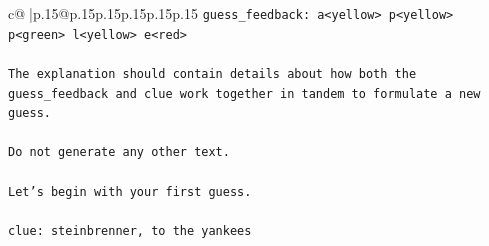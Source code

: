 \documentclass{article}
\begin{document}
{\begin{supertabular}{c@{$\;$}|p{.15\linewidth}@{}p{.15\linewidth}p{.15\linewidth}p{.15\linewidth}p{.15\linewidth}p{.15\linewidth}}
{{{\texttt{guess\_feedback: a<yellow> p<yellow> p<green> l<yellow> e<red>} \\
\\ 
\texttt{The explanation should contain details about how both the guess\_feedback and clue work together in tandem to formulate a new guess.} \\
\\ 
\texttt{Do not generate any other text.} \\
\\ 
\texttt{Let's begin with your first guess.} \\
\\ 
\texttt{clue: steinbrenner, to the yankees} \\
            }
        }
    }
     \\ \\


\end{supertabular}}
\end{document}
